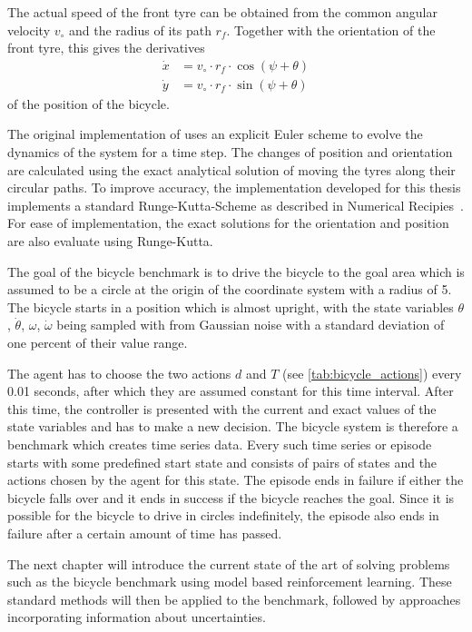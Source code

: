 The actual speed of the front tyre can be obtained from the common angular velocity $v_\circ$ and the radius of its path $r_f$.
Together with the orientation of the front tyre, this gives the derivatives
\begin{align}
    \dot{x} &= v_\circ \cdot r_f \cdot \cos(\psi + \theta) \\
    \dot{y} &= v_\circ \cdot r_f \cdot \sin(\psi + \theta)
\end{align}
of the position of the bicycle.

The original implementation of \citeauthor{randlov_learning_1998} uses an explicit Euler scheme to evolve the dynamics of the system for a time step.
The changes of position and orientation are calculated using the exact analytical solution of moving the tyres along their circular paths.
To improve accuracy, the implementation developed for this thesis implements a standard Runge-Kutta-Scheme as described in Numerical Recipies~\cite[908]{press_numerical_2007}.
For ease of implementation, the exact solutions for the orientation and position are also evaluate using Runge-Kutta.

The goal of the bicycle benchmark is to drive the bicycle to the goal area which is assumed to be a circle at the origin of the coordinate system with a radius of 5.
The bicycle starts in a position which is almost upright, with the state variables $\theta$, $\dot{\theta}$, $\omega$, $\dot{\omega}$ being sampled with from Gaussian noise with a standard deviation of one percent of their value range.

The agent has to choose the two actions $d$ and $T$ (see \cref{tab:bicycle_actions}) every 0.01 seconds, after which they are assumed constant for this time interval.
After this time, the controller is presented with the current and exact values of the state variables and has to make a new decision.
The bicycle system is therefore a benchmark which creates time series data.
Every such time series or episode starts with some predefined start state and consists of pairs of states and the actions chosen by the agent for this state.
The episode ends in failure if either the bicycle falls over and it ends in success if the bicycle reaches the goal.
Since it is possible for the bicycle to drive in circles indefinitely, the episode also ends in failure after a certain amount of time has passed.

The next chapter will introduce the current state of the art of solving problems such as the bicycle benchmark using model based reinforcement learning.
These standard methods will then be applied to the benchmark, followed by approaches incorporating information about uncertainties.
